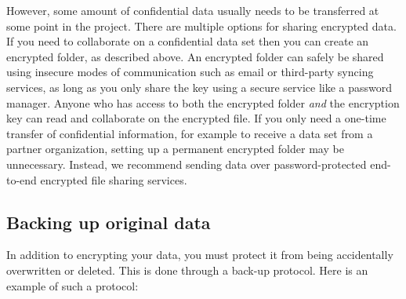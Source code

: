 However, some amount of confidential data usually needs to be transferred at some point in the project.
There are multiple options for sharing encrypted data.
If you need to collaborate on a confidential data set
then you can create an encrypted folder, as described above.
An encrypted folder can safely be shared using insecure modes of communication
such as email or third-party syncing services,
as long as you only share the key
using a secure service like a password manager.
Anyone who has access to both the encrypted folder \textit{and} the encryption key
can read and collaborate on the encrypted file.
If you only need a one-time transfer of confidential information,
for example to receive a data set from a partner organization,
setting up a permanent encrypted folder may be unnecessary.
Instead, we recommend sending data over password-protected
end-to-end encrypted file sharing services.

\subsection{Backing up original data}
In addition to encrypting your data, you must protect it 
from being accidentally overwritten or deleted.
This is done through a back-up protocol.
Here is an example of such a protocol:

